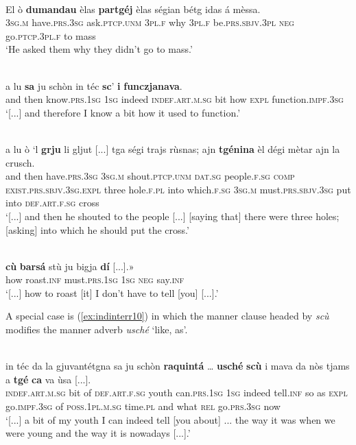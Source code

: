 \ea\label{ex:indinterr6}
 {\citealt[103]{Büchli1966}}\\
\gll    El ò \textbf{dumandau} èlas \textbf{partgéj} èlas ségian bétg idas á mèssa.\\
\textsc{3sg.m} have.\textsc{prs.3sg} ask.\textsc{ptcp.unm} \textsc{3pl.f} why  \textsc{3pl.f} be.\textsc{prs.sbjv.3pl} \textsc{neg} go.\textsc{ptcp.3pl.f} to mass\\
\glt `He asked them why they didn’t go to mass.'
\z

\ea
\label{ex:indinterr7}
\\
\gll [...] a lu \textbf{sa} ju schòn in téc \textbf{sc}’ \textbf{i} \textbf{funczjanava}.   \\
{} and then know.\textsc{prs.1sg} \textsc{1sg} indeed \textsc{indef.art.m.sg} bit how \textsc{expl} function.\textsc{impf.3sg}\\
\glt `[...] and therefore I know a bit how it used to function.'
\z

\ea
\label{ex:indinterr8}
 {\citealt[134]{Büchli1966}}\\
\gll [...] a lu ò `l \textbf{grju} li gljut [...] tga ségi trajs rùsnas; ajn \textbf{tgénina} èl dégi mètar ajn la crusch.\\
{} and then have.\textsc{prs.3sg} \textsc{3sg.m} shout.\textsc{ptcp.unm} \textsc{dat.sg} people.\textsc{f.sg} {} \textsc{comp} \textsc{exist.prs.sbjv.3sg.expl} three hole.\textsc{f.pl} into which.\textsc{f.sg} \textsc{3sg.m} must.\textsc{prs.sbjv.3sg} put into \textsc{def.art.f.sg} cross\\
\glt `[...] and then he shouted to the people [...] [saying that] there were three holes; [asking] into which he should put the cross.'
\z

\ea
\label{ex:indinterr9}
\\
\gll [...] \textbf{cù} \textbf{barsá} stù ju bigja \textbf{dí} [...].»\\
{} how roast.\textsc{inf} must.\textsc{prs.1sg} \textsc{1sg} \textsc{neg} say.\textsc{inf}\\
\glt `[...] how to roast [it] I don't have to tell [you] [...].'
\z

A special case is (\ref{ex:indinterr10}) in which the manner clause headed by \textit{scù} modifies the manner adverb \textit{usché} `like, as'.

\ea
\label{ex:indinterr10}
\\
\gll [...] in téc da la gjuvantétgna sa ju schòn \textbf{raquintá} … \textbf{usché} \textbf{scù} i mava da nòs tjams a \textbf{tgé} \textbf{ca} va ùsa [...].\\
{} \textsc{indef.art.m.sg} bit of \textsc{def.art.f.sg} youth can.\textsc{prs.1sg} \textsc{1sg} indeed tell.\textsc{inf} {} so as \textsc{expl} go.\textsc{impf.3sg} of \textsc{poss.1pl.m.sg} time.\textsc{pl} and what \textsc{rel} go.\textsc{prs.3sg} now \\
\glt `[...] a bit of my youth I can indeed tell [you about] ... the way it was when we were young and the way it is nowadays [...].'
\z


